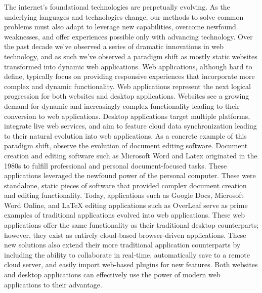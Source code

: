 %
%

The internet’s foundational technologies are perpetually evolving.  As the underlying languages and technologies change, our methods to solve common problems must also adapt to leverage new capabilities, overcome newfound weaknesses, and offer experiences possible only with advancing technology. Over the past decade we’ve observed a series of dramatic innovations in web technology, and as such we’ve observed a paradigm shift as mostly static websites transformed into dynamic web applications.  Web applications, although hard to define, typically focus on providing responsive experiences that incorporate more complex and dynamic functionality.  Web applications represent the next logical progression for both websites and desktop applications.  Websites see a growing demand for dynamic and increasingly complex functionality leading to their conversion to web applications.  Desktop applications target multiple platforms, integrate live web services, and aim to feature cloud data synchronization leading to their natural evolution into web applications.  As a concrete example of this paradigm shift, observe the evolution of document editing software.  Document creation and editing software such as Microsoft Word and Latex originated in the 1980s to fulfill professional and personal document-focused tasks.  These applications leveraged the newfound power of the personal computer.  These were standalone, static pieces of software that provided complex document creation and editing functionality.  Today, applications such as Google Docs, Microsoft Word Online, and LaTeX editing applications such as OverLeaf serve as prime examples of traditional applications evolved into web applications. These web applications offer the same functionality as their traditional desktop counterparts; however, they exist as entirely cloud-based browser-driven applications.  These new solutions also extend their more traditional application counterparts by including the ability to collaborate in real-time, automatically save to a remote cloud server, and easily import web-based plugins for new features.  Both websites and desktop applications can effectively use the power of modern web applications to their advantage. \par
